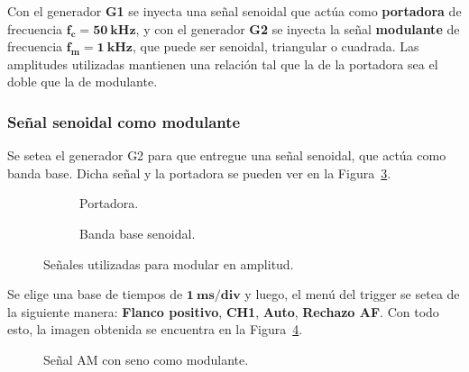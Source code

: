     Con el generador \textbf{G1} se inyecta una señal senoidal que actúa como \textbf{portadora} de frecuencia 
    $\mathbf{f_c=50~kHz}$, y con el generador \textbf{G2} se inyecta la señal \textbf{modulante} de frecuencia
    $\mathbf{f_m=1~kHz}$, que puede ser senoidal, triangular o cuadrada. Las amplitudes utilizadas mantienen 
    una relación tal que la de la portadora sea el doble que la de modulante.

    \subsubsection{Señal senoidal como modulante}
      Se setea el generador G2 para que entregue una señal senoidal, que actúa como banda base. Dicha señal
      y la portadora se pueden ver en la Figura~\ref{fig:SeñalesParaAM1}.
      
      \begin{figure}[H]
        \centering
        \begin{subfigure}[H]{0.48\textwidth}
          \caption{Portadora.}
          \label{fig:PortadoraEnTiempo}
        \end{subfigure}
        \hfill 
        \begin{subfigure}[H]{0.45\textwidth}
          \caption{Banda base senoidal.}
          \label{fig:SenoModulanteEnTiempo}
        \end{subfigure}
      
        \caption{Señales utilizadas para modular en amplitud.}
        \label{fig:SeñalesParaAM1}
      \end{figure}
        
      
      Se elige una base de tiempos de $\mathbf{1~ms/div}$ y luego, el menú del trigger se setea de la siguiente manera:
      \textbf{Flanco positivo}, \textbf{CH1}, \textbf{Auto}, \textbf{Rechazo AF}. Con
      todo esto, la imagen obtenida se encuentra en la Figura~\ref{fig:SeñalAM1EnTiempo}.
      
      \begin{figure}[H]
        \centering
        \caption{Señal AM con seno como modulante.}
        \label{fig:SeñalAM1EnTiempo}
      \end{figure}

